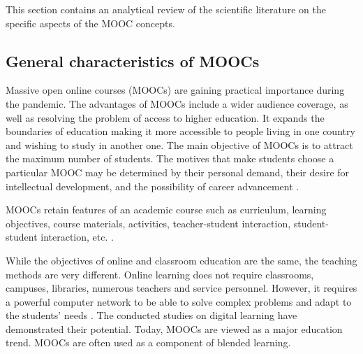 \documentclass[english]{textolivre}
\begin{document}
This section contains an analytical review of the scientific literature on the specific aspects of the MOOC concepts.

\subsection{General characteristics of MOOCs}

Massive open online courses (MOOCs) are gaining practical importance during the pandemic. The advantages of MOOCs include a wider audience coverage, as well as resolving the problem of access to higher education. It expands the boundaries of education making it more accessible to people living in one country and wishing to study in another one. The main objective of MOOCs is to attract the maximum number of students. The motives that make students choose a particular MOOC may be determined by their personal demand, their desire for intellectual development, and the possibility of career advancement \cite{hew_students_2014}.

MOOCs retain features of an academic course such as curriculum, learning objectives, course materials, activities, teacher-student interaction, student-student interaction, etc. \cite[p. 107]{martin-monje_researching_2021}.

While the objectives of online and classroom education are the same, the teaching methods are very different. Online learning does not require classrooms, campuses, libraries, numerous teachers and service personnel. However, it requires a powerful computer network to be able to solve complex problems and adapt to the students’ needs \cite{kadlecik_efficacy_2020}. The conducted studies on digital learning have demonstrated their potential. Today, MOOCs are viewed as a major education trend. MOOCs are often used as a component of blended learning.
\end{document}
